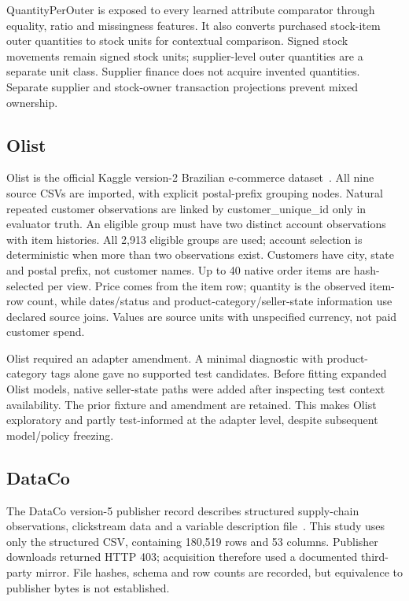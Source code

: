 \documentclass[11pt,letterpaper]{article}
\begin{document}
QuantityPerOuter is exposed to every learned attribute comparator through equality, ratio and missingness features. It also converts purchased stock-item outer quantities to stock units for contextual comparison. Signed stock movements remain signed stock units; supplier-level outer quantities are a separate unit class. Supplier finance does not acquire invented quantities. Separate supplier and stock-owner transaction projections prevent mixed ownership.

\subsection{Olist}
Olist is the official Kaggle version-2 Brazilian e-commerce dataset~\cite{olist}. All nine source CSVs are imported, with explicit postal-prefix grouping nodes. Natural repeated customer observations are linked by customer\_unique\_id only in evaluator truth. An eligible group must have two distinct account observations with item histories. All 2,913 eligible groups are used; account selection is deterministic when more than two observations exist. Customers have city, state and postal prefix, not customer names. Up to 40 native order items are hash-selected per view. Price comes from the item row; quantity is the observed item-row count, while dates/status and product-category/seller-state information use declared source joins. Values are source units with unspecified currency, not paid customer spend.

Olist required an adapter amendment. A minimal diagnostic with product-category tags alone gave no supported test candidates. Before fitting expanded Olist models, native seller-state paths were added after inspecting test context availability. The prior fixture and amendment are retained. This makes Olist exploratory and partly test-informed at the adapter level, despite subsequent model/policy freezing.

\subsection{DataCo}
The DataCo version-5 publisher record describes structured supply-chain observations, clickstream data and a variable description file~\cite{dataco}. This study uses only the structured CSV, containing 180,519 rows and 53 columns. Publisher downloads returned HTTP 403; acquisition therefore used a documented third-party mirror. File hashes, schema and row counts are recorded, but equivalence to publisher bytes is not established.
\end{document}
